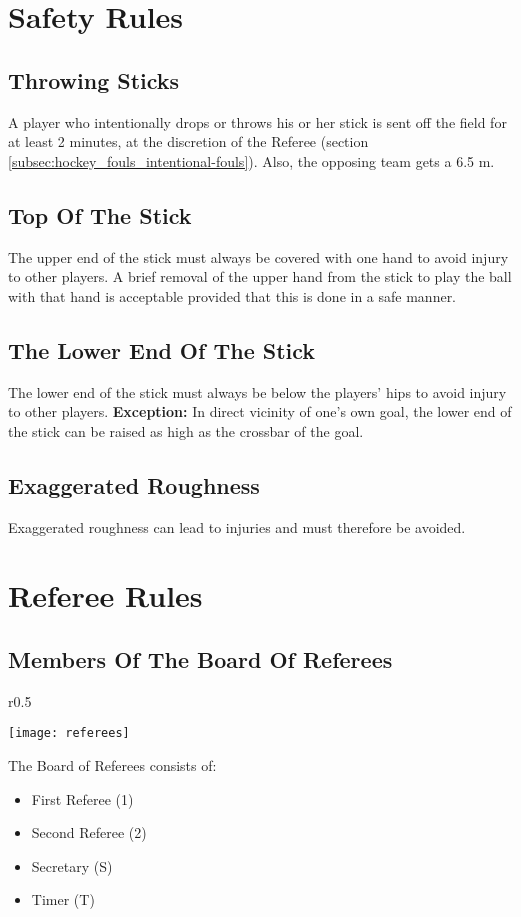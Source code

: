\section{Safety Rules}

\subsection{Throwing Sticks}
A player who intentionally drops or throws his or her stick is sent off the field for at least 2 minutes, at the discretion of the Referee (section \ref{subsec:hockey_fouls_intentional-fouls}).
Also, the opposing team gets a 6.5 m.

\subsection{Top Of The Stick}
The upper end of the stick must always be covered with one hand to avoid injury to other players.
A brief removal of the upper hand from the stick to play the ball with that hand is acceptable provided that this is done in a safe manner.

\subsection{The Lower End Of The Stick}
The lower end of the stick must always be below the players' hips to avoid injury to other players.
\textbf{Exception:} In direct vicinity of one's own goal, the lower end of the stick can be raised as high as the crossbar of the goal.

\subsection{Exaggerated Roughness}
Exaggerated roughness can lead to injuries and must therefore be avoided.

\section{Referee Rules}

 \subsection{Members Of The Board Of Referees}
\begin{wrapfigure}{r}{0.5\textwidth}
\begin{center}
\texttt{[image: referees]}
\end{center}
\end{wrapfigure}
 The Board of Referees consists of:
\begin{itemize}
\item First Referee (1) 
\item Second Referee (2)
\item Secretary (S)
\item Timer (T)
\end{itemize} 

